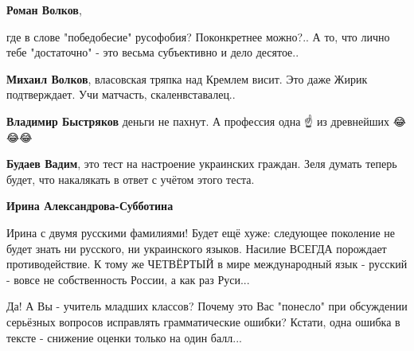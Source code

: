 \begin{itemize}
\begin{itemize}
\textbf{Роман Волков}, 

где в слове "победобесие" русофобия? Поконкретнее можно?.. А то, что лично тебе
"достаточно" - это весьма субъективно и дело десятое..

 
\textbf{Михаил Волков}, власовская тряпка над Кремлем висит. Это даже Жирик подтверждает. Учи матчасть, скаленвставалец..

 
\textbf{Владимир Быстряков} деньги не пахнут. А профессия одна ☝️ из древнейших 😂😂😂

 
\textbf{Будаев Вадим}, это тест на настроение украинских граждан. Зеля думать теперь будет, что накалякать в ответ с учётом этого теста.

 
\textbf{Ирина Александрова-Субботина} 

Ирина с двумя русскими фамилиями! Будет ещё хуже: следующее поколение не будет
знать ни русского, ни украинского языков. Насилие ВСЕГДА порождает
противодействие. К тому же ЧЕТВЁРТЫЙ в мире международный язык - русский -
вовсе не собственность России, а как раз Руси... 

Да! А Вы - учитель младших классов? Почему это Вас "понесло" при обсуждении
серьёзных вопросов исправлять грамматические ошибки? Кстати, одна ошибка в
тексте - снижение оценки только на один балл...

 


\end{itemize}
\end{itemize}
